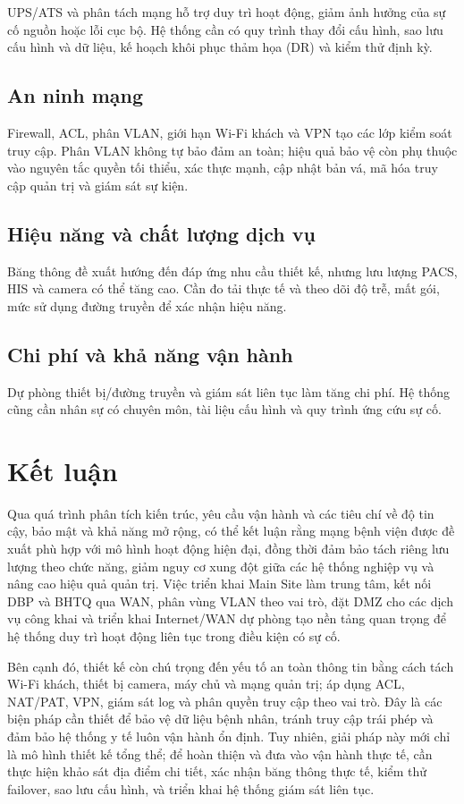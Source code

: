 UPS/ATS và phân tách mạng hỗ trợ duy trì hoạt động, giảm ảnh hưởng của sự cố nguồn hoặc lỗi cục bộ. Hệ thống cần có quy trình thay đổi cấu hình, sao lưu cấu hình và dữ liệu, kế hoạch khôi phục thảm họa (DR) và kiểm thử định kỳ.

\subsection{An ninh mạng}

Firewall, ACL, phân VLAN, giới hạn Wi-Fi khách và VPN tạo các lớp kiểm soát truy cập. Phân VLAN không tự bảo đảm an toàn; hiệu quả bảo vệ còn phụ thuộc vào nguyên tắc quyền tối thiểu, xác thực mạnh, cập nhật bản vá, mã hóa truy cập quản trị và giám sát sự kiện.

\subsection{Hiệu năng và chất lượng dịch vụ}

Băng thông đề xuất hướng đến đáp ứng nhu cầu thiết kế, nhưng lưu lượng PACS, HIS và camera có thể tăng cao. Cần đo tải thực tế và theo dõi độ trễ, mất gói, mức sử dụng đường truyền để xác nhận hiệu năng.

\subsection{Chi phí và khả năng vận hành}

Dự phòng thiết bị/đường truyền và giám sát liên tục làm tăng chi phí. Hệ thống cũng cần nhân sự có chuyên môn, tài liệu cấu hình và quy trình ứng cứu sự cố.

\section{Kết luận}

Qua quá trình phân tích kiến trúc, yêu cầu vận hành và các tiêu chí về độ tin cậy, bảo mật và khả năng mở rộng, có thể kết luận rằng mạng bệnh viện được đề xuất phù hợp với mô hình hoạt động hiện đại, đồng thời đảm bảo tách riêng lưu lượng theo chức năng, giảm nguy cơ xung đột giữa các hệ thống nghiệp vụ và nâng cao hiệu quả quản trị. Việc triển khai Main Site làm trung tâm, kết nối DBP và BHTQ qua WAN, phân vùng VLAN theo vai trò, đặt DMZ cho các dịch vụ công khai và triển khai Internet/WAN dự phòng tạo nền tảng quan trọng để hệ thống duy trì hoạt động liên tục trong điều kiện có sự cố.

Bên cạnh đó, thiết kế còn chú trọng đến yếu tố an toàn thông tin bằng cách tách Wi-Fi khách, thiết bị camera, máy chủ và mạng quản trị; áp dụng ACL, NAT/PAT, VPN, giám sát log và phân quyền truy cập theo vai trò. Đây là các biện pháp cần thiết để bảo vệ dữ liệu bệnh nhân, tránh truy cập trái phép và đảm bảo hệ thống y tế luôn vận hành ổn định. Tuy nhiên, giải pháp này mới chỉ là mô hình thiết kế tổng thể; để hoàn thiện và đưa vào vận hành thực tế, cần thực hiện khảo sát địa điểm chi tiết, xác nhận băng thông thực tế, kiểm thử failover, sao lưu cấu hình, và triển khai hệ thống giám sát liên tục.

